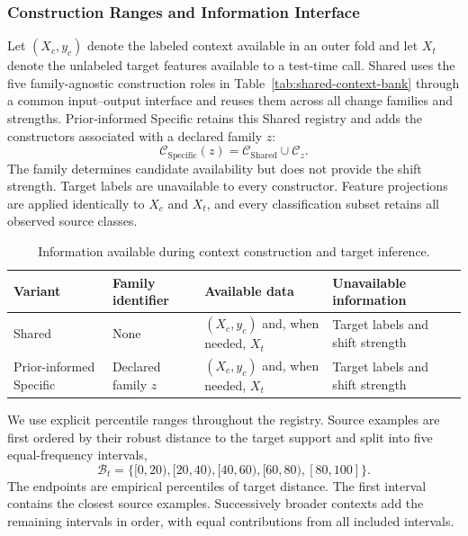 \subsubsection{Construction Ranges and Information Interface}

Let $(X_c,y_c)$ denote the labeled context available in an outer fold and let
$X_t$ denote the unlabeled target features available to a test-time call.
Shared uses the five family-agnostic
construction roles in Table~\ref{tab:shared-context-bank} through a common
input--output interface and reuses them across all change families and
strengths. Prior-informed Specific retains this Shared registry and adds the
constructors associated with a declared family $z$:
\begin{equation}
  \mathcal C_{\mathrm{Specific}}(z)
  =\mathcal C_{\mathrm{Shared}}\cup\mathcal C_z.
  \label{eq:specific-context-bank}
\end{equation}
The family determines candidate availability but does not provide the shift
strength. Target labels are unavailable to every constructor. Feature
projections are applied identically to $X_c$ and $X_t$, and every
classification subset retains all observed source classes.

\begin{table}[H]
  \caption{Information available during context construction and target
  inference.}
  \label{tab:context-information-interface}
  \centering
  \footnotesize
  \setlength{\tabcolsep}{4pt}
  \begin{tabular}{@{}>{\raggedright\arraybackslash}p{}
                      >{\raggedright\arraybackslash}p{}
                      >{\raggedright\arraybackslash}p{}
                      >{\raggedright\arraybackslash}p{}@{}}
    \toprule
    Variant & Family identifier & Available data & Unavailable information \\
    \midrule
    Shared & None & $(X_c,y_c)$ and, when needed, $X_t$
      & Target labels and shift strength \\
    Prior-informed Specific & Declared family $z$
      & $(X_c,y_c)$ and, when needed, $X_t$
      & Target labels and shift strength \\
    \bottomrule
  \end{tabular}
\end{table}

We use explicit percentile ranges throughout the registry. Source examples are
first ordered by their robust distance to the target support and split into
five equal-frequency intervals,
\begin{equation}
  \mathcal B_t=\{[0,20),[20,40),[40,60),[60,80),[80,100]\}.
  \label{eq:target-support-bins}
\end{equation}
The endpoints are empirical percentiles of target distance. The first interval
contains the closest source examples. Successively broader contexts add the
remaining intervals in order, with equal contributions from all included
intervals.

